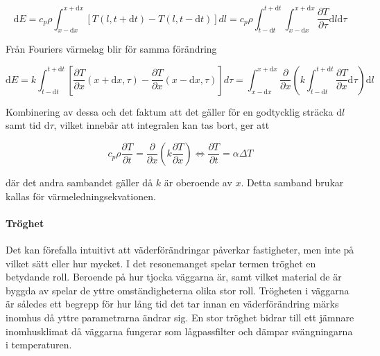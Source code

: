 \begin{equation}
\mathrm{d}E = c_p \rho \int_{x-\mathrm{d}x}^{x+\mathrm{d}x} \left[ T\left( l, t+\mathrm{d}t\right) - T\left( l, t-\mathrm{d}t\right)\right]dl = c_p \rho \int_{t-\mathrm{d}t}^{t+\mathrm{d}t} \int_{x-\mathrm{d}x}^{x+\mathrm{d}x} \frac{\partial T}{\partial \tau} \mathrm{d}l\mathrm{d}\tau
\end{equation}

Från Fouriers värmelag blir för samma förändring

\begin{equation}
\mathrm{d}E = k\int_{t-\mathrm{d}t}^{t+\mathrm{d}t} \left[ \frac{\partial T}{\partial x}\left( x + \mathrm{d}x, \tau \right) - \frac{\partial T}{\partial x}\left( x-\mathrm{d}x, \tau \right)\right]d\tau =  \int_{x-\mathrm{d}x}^{x+\mathrm{d}x} \frac{\partial}{\partial x} \left( k \int_{t-\mathrm{d}t}^{t+\mathrm{d}t} \frac{\partial T}{\partial x} \mathrm{d}\tau \right)\mathrm{d}l
\end{equation}

Kombinering av dessa och det faktum att det gäller för en godtycklig sträcka $\mathrm{d}l$ samt tid $\mathrm{d}\tau$, vilket innebär att integralen kan tas bort, ger att

\begin{equation}\label{eq:conduction:heateq}\boxed{ \; \; \;
c_p \rho \frac{\partial T}{\partial t} = \frac{\partial}{\partial x} \left( k \frac{\partial T}{\partial x} \right) \Leftrightarrow \frac{\partial T}{\partial t} = \alpha \Delta T
\; \; \; }
\end{equation}

där det andra sambandet gäller då $k$ är oberoende av $x$. Detta samband brukar kallas för värmeledningsekvationen.

\paragraph{Tröghet}
Det kan förefalla intuitivt att väderförändringar påverkar fastigheter, men inte på vilket sätt eller hur mycket. I det resonemanget spelar termen tröghet en betydande roll. Beroende på hur tjocka väggarna är, samt vilket material de är byggda av spelar de yttre omständigheterna olika stor roll. Trögheten i väggarna är således ett begrepp för hur lång tid det tar innan en väderförändring märks inomhus då yttre parametrarna ändrar sig. En stor tröghet bidrar till ett jämnare inomhusklimat då väggarna fungerar som lågpassfilter och dämpar svängningarna i temperaturen.

